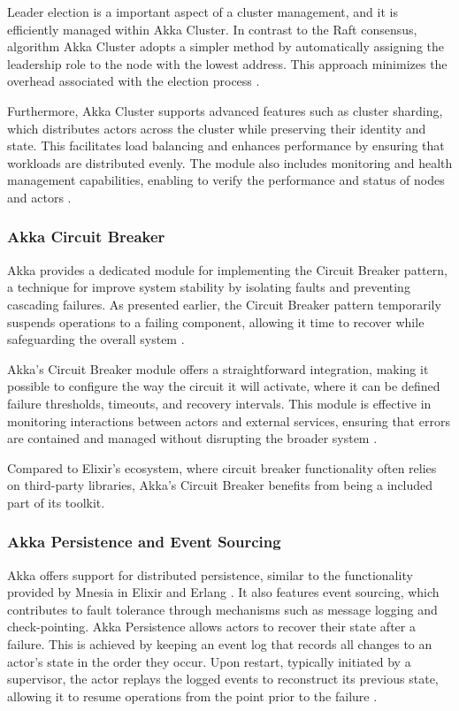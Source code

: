 Leader election is a important aspect of a cluster management, and it is efficiently managed within Akka Cluster. In contrast to the Raft consensus, algorithm Akka Cluster adopts a simpler method by automatically assigning the leadership role to the node with the lowest address. This approach minimizes the overhead associated with the election process \cite{raft-diego,akka-docs}.

Furthermore, Akka Cluster supports advanced features such as cluster sharding, which distributes actors across the cluster while preserving their identity and state. This facilitates load balancing and enhances performance by ensuring that workloads are distributed evenly. The module also includes monitoring and health management capabilities, enabling to verify the performance and status of nodes and actors \cite{Abraham2023}.

\subsubsection{Akka Circuit Breaker}

Akka provides a dedicated module for implementing the Circuit Breaker pattern, a technique for improve system stability by isolating faults and preventing cascading failures. As presented earlier, the Circuit Breaker pattern temporarily suspends operations to a failing component, allowing it time to recover while safeguarding the overall system \cite{fowler-circuit-breakers}.

Akka’s Circuit Breaker module offers a straightforward integration, making it possible to configure the way the circuit it will activate, where it can be defined failure thresholds, timeouts, and recovery intervals. This module is effective in monitoring interactions between actors and external services, ensuring that errors are contained and managed without disrupting the broader system \cite{akka-docs}.

Compared to Elixir’s ecosystem, where circuit breaker functionality often relies on third-party libraries, Akka’s Circuit Breaker benefits from being a included part of its toolkit.

\subsubsection{Akka Persistence and Event Sourcing}

Akka offers support for distributed persistence, similar to the functionality provided by Mnesia in Elixir and Erlang \cite{akka-docs,elixir-docs-hexdocs}. It also features event sourcing, which contributes to fault tolerance through mechanisms such as message logging and check-pointing. Akka Persistence allows actors to recover their state after a failure. This is achieved by keeping an event log that records all changes to an actor’s state in the order they occur. Upon restart, typically initiated by a supervisor, the actor replays the logged events to reconstruct its previous state, allowing it to resume operations from the point prior to the failure \cite{akka-docs}.

